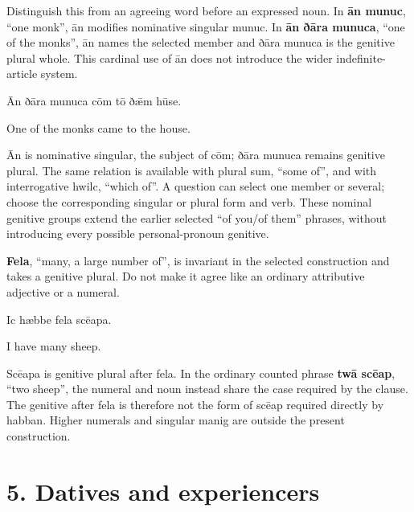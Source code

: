 Distinguish this from an agreeing word before an expressed noun. In \textbf{ān munuc}, “one monk”, ān modifies nominative singular munuc. In \textbf{ān ðāra munuca}, “one of the monks”, ān names the selected member and ðāra munuca is the genitive plural whole. This cardinal use of ān does not introduce the wider indefinite-article system.

Ān ðāra munuca cōm tō ðǣm hūse.

One of the monks came to the house.

Ān is nominative singular, the subject of cōm; ðāra munuca remains genitive plural. The same relation is available with plural sum, “some of”, and with interrogative hwilc, “which of”. A question can select one member or several; choose the corresponding singular or plural form and verb. These nominal genitive groups extend the earlier selected “of you/\allowbreak{}of them” phrases, without introducing every possible personal-pronoun genitive.

\textbf{Fela}, “many, a large number of”, is invariant in the selected construction and takes a genitive plural. Do not make it agree like an ordinary attributive adjective or a numeral.

Ic hæbbe fela scēapa.

I have many sheep.

Scēapa is genitive plural after fela. In the ordinary counted phrase \textbf{twā scēap}, “two sheep”, the numeral and noun instead share the case required by the clause. The genitive after fela is therefore not the form of scēap required directly by habban. Higher numerals and singular manig are outside the present construction.

\section*{5. Datives and experiencers}

